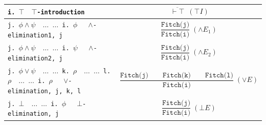 \documentclass{article}
\begin{document}
\begin{center}
\begin{longtable}{|p{}|p{}|}
\hline








\texttt{i. $\top \quad \top$-introduction}
&
$$\displaystyle
\overline{\ \vdash \top\ }\;(\top I)$$
\\

\hline


\texttt{j. $  \phi \land \psi  \quad  \dots$
     \newline
     $\dots$
     \newline
     i. $\phi \quad$ $\land$-elimination1, j}
&
$$\displaystyle
\frac{\texttt{Fitch(j)}}{\texttt{Fitch(i)}}\;(\land E_1)
$$
\\

\hline



\texttt{j. $  \phi \land \psi  \quad  \dots$
     \newline
     $\dots$
     \newline
     i. $\psi \quad$ $\land$-elimination2, j}
&
$$\displaystyle
\frac{\texttt{Fitch(j)}}{\texttt{Fitch(i)}}\;(\land E_2)
$$
\\

\hline










\texttt{j. $  \phi \lor \psi  \quad  \dots$
     \newline
     $\dots$
     \newline
     k.  $\rho  \quad  \dots$
     \newline
     $\dots$
     \newline
     l. $\rho  \quad  \dots$
     \newline
     $\dots$
     \newline     i. $\rho \quad$ $\lor$-elimination, j, k, l}
&
$$
\displaystyle
\frac{\texttt{Fitch(j)} \qquad \texttt{Fitch(k)} \qquad \texttt{Fitch(l)}}
     {\texttt{Fitch(i)}}\;(\vee E)
$$
     \\



\hline

\texttt{j. $  \bot \quad  \dots$
     \newline
     $\dots$
     \newline     i. $\phi \quad$ $\bot$-elimination, j}
&
$$
\displaystyle
\frac{\texttt{Fitch(j)} }
     {\texttt{Fitch(i)}}\;(\bot E)
$$
\\
\hline







\end{longtable}
\end{center}
\end{document}
